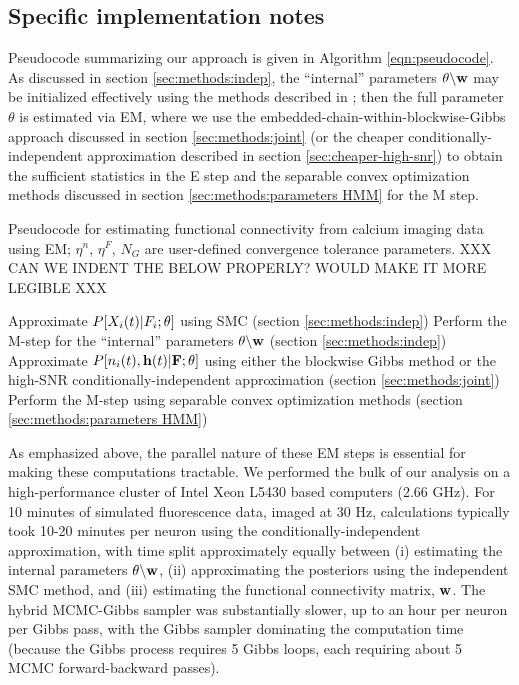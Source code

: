 \subsection{Specific implementation notes} \label{sec:methods:specific_implementation}

Pseudocode summarizing our approach is given in Algorithm
\ref{eqn:pseudocode}.  As discussed in section
\ref{sec:methods:indep}, the ``internal'' parameters $\theta
\backslash \mathbf{w}$ may be initialized effectively using the methods
described in \cite{Vogelstein2009}; then the full parameter $\theta$
is estimated via EM, where we use the
embedded-chain-within-blockwise-Gibbs approach discussed in section
\ref{sec:methods:joint} (or the cheaper conditionally-independent
approximation described in section \ref{sec:cheaper-high-snr}) to
obtain the sufficient statistics in the E step and the separable
convex optimization methods discussed in section
\ref{sec:methods:parameters HMM} for the M step.

\begin{algorithm}
\caption{Pseudocode for estimating functional connectivity from
calcium imaging data using EM; $\eta^n$, $\eta^F$, $N_G$ are
user-defined convergence tolerance parameters.   XXX CAN WE INDENT
THE BELOW PROPERLY?  WOULD MAKE IT MORE LEGIBLE XXX}
\label{eqn:pseudocode}
\begin{algorithmic}
      \State Approximate $P[X_i(t)|F_i; \mathbf{\theta}]$ using SMC (section
  \ref{sec:methods:indep})
      \State Perform the M-step for the ``internal'' parameters
  $\theta \backslash \mathbf{w}$ (section \ref{sec:methods:indep}) 
    \EndWhile
  \EndFor
      \State Approximate $P[n_i(t), \mathbf{h}(t) |{\bf F}; \mathbf{\theta}]$ using
  either the blockwise Gibbs method or the high-SNR
  conditionally-independent approximation (section \ref{sec:methods:joint})
    \EndFor
  	\State Perform the M-step using separable convex optimization
  methods (section \ref{sec:methods:parameters HMM})  
  \EndFor
\EndWhile
\end{algorithmic}
\end{algorithm}

As emphasized above, the parallel nature of these EM steps is
essential for making these computations tractable.  We performed the
bulk of our analysis on a high-performance cluster of Intel Xeon L5430
based computers (2.66 GHz). For 10 minutes of simulated fluorescence
data, imaged at $30$ Hz, calculations typically took 10-20 minutes per
neuron using the conditionally-independent approximation, with time
split approximately equally between (i) estimating the internal
parameters $\theta \backslash \mathbf{w}$, (ii) approximating the posteriors
using the independent SMC method, and (iii) estimating the functional
connectivity matrix, $\mathbf{w}$.  The hybrid MCMC-Gibbs sampler was
substantially slower, up to an hour per neuron per Gibbs pass, with
the Gibbs sampler dominating the computation time (because the Gibbs process requires 5 Gibbs loops, each requiring about 5 MCMC forward-backward passes).


